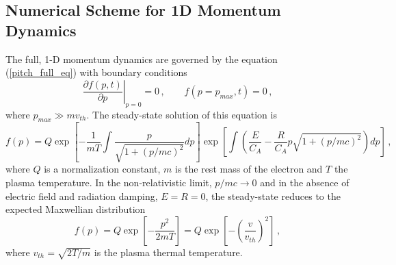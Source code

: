 \documentclass[preprint,11pt]{elsarticle}
\newcommand{\bq}{\begin{equation}}
\newcommand{\eq}{\end{equation}}
\begin{document}
\subsection{Numerical Scheme for 1D Momentum Dynamics} 
\label{sec:Mom}
The full, 1-D momentum dynamics are governed by the equation (\ref{pitch_full_eq}) with boundary conditions
\bq
\left. \frac{\partial f (p,t)}{\partial p}\right|_{p=0}=0 \, , \qquad f(p=p_{max},t)=0 \, ,
\eq
where $p_{max} \gg m v_{th}$. 
The steady-state solution of this equation is
\bq
f(p)=Q \exp \left[-\frac{1}{m T} \int \frac{p}{\sqrt{1+(p/mc)^2}} dp \right]
\exp \left[\int \left( \frac{E}{C_A} -\frac{R}{C_A} p  \sqrt{1+(p/mc)^2} \right) dp \right] \, ,
\eq
where $Q$ is a normalization constant, $m$ is the rest mass of the electron and $T$ the plasma temperature. 
In the non-relativistic limit, $p/mc\rightarrow 0$ and in the absence of electric field and radiation damping, $E=R=0$, the steady-state reduces to the expected Maxwellian distribution 
\bq
\label{eq_maxwell}
f(p)=Q \exp \left[-\frac{p^2}{2m T} \right]= Q \exp \left[-\left(\frac{v}{v_{th}}\right)^2 \right] \, ,
\eq
where $v_{th}=\sqrt{2 T/m}$ is the plasma thermal temperature. 
\end{document}
